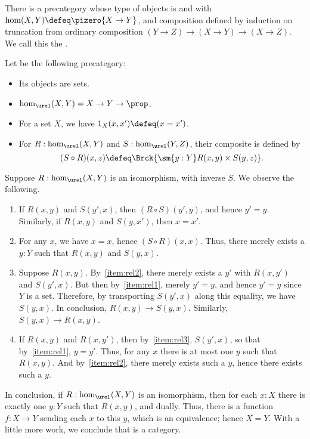 \begin{eg}\label{ct:hoprecat}
  There is a precategory whose type of objects is \type and with $\hom(X,Y) \defeq \pizero{X\to Y}$, and composition defined by induction on truncation from ordinary composition $(Y\to Z) \to (X\to Y) \to (X\to Z)$.
  We call this the .
\end{eg}

\begin{eg}\label{ct:rel}
  Let \urel be the following precategory:
  \begin{itemize}
  \item Its objects are sets.
  \item $\hom_{\urel}(X,Y) = X\to Y\to \prop$.
  \item For a set $X$, we have $1_X(x,x') \defeq (x=x')$.
  \item For $R:\hom_{\urel}(X,Y)$ and $S:\hom_{\urel}(Y,Z)$, their composite is defined by
    \[ (S\circ R)(x,z) \defeq \Brck{\sm{y:Y} R(x,y) \times S(y,z)}.\]
  \end{itemize}
  Suppose $R:\hom_{\urel}(X,Y)$ is an isomorphism, with inverse $S$.
  We observe the following.
  \begin{enumerate}
  \item If $R(x,y)$ and $S(y',x)$, then $(R\circ S)(y',y)$, and hence $y'=y$.
    Similarly, if $R(x,y)$ and $S(y,x')$, then $x=x'$.\label{item:rel1}
  \item For any $x$, we have $x=x$, hence $(S\circ R)(x,x)$.
    Thus, there merely exists a $y:Y$ such that $R(x,y)$ and $S(y,x)$.\label{item:rel2}
  \item Suppose $R(x,y)$.
    By~\ref{item:rel2}, there merely exists a $y'$ with $R(x,y')$ and $S(y',x)$.
    But then by~\ref{item:rel1}, merely $y'=y$, and hence $y'=y$ since $Y$ is a set.
    Therefore, by transporting $S(y',x)$ along this equality, we have $S(y,x)$.
    In conclusion, $R(x,y)\to S(y,x)$.
    Similarly, $S(y,x) \to R(x,y)$.\label{item:rel3}
  \item If $R(x,y)$ and $R(x,y')$, then by~\ref{item:rel3}, $S(y',x)$, so that by~\ref{item:rel1}, $y=y'$.
    Thus, for any $x$ there is at most one $y$ such that $R(x,y)$.
    And by~\ref{item:rel2}, there merely exists such a $y$, hence there exists such a $y$.
  \end{enumerate}
  In conclusion, if $R:\hom_{\urel}(X,Y)$ is an isomorphism, then for each $x:X$ there is exactly one $y:Y$ such that $R(x,y)$, and dually.
  Thus, there is a function $f:X\to Y$ sending each $x$ to this $y$, which is an equivalence; hence $X=Y$.
  With a little more work, we conclude that \urel is a category.
\end{eg}

